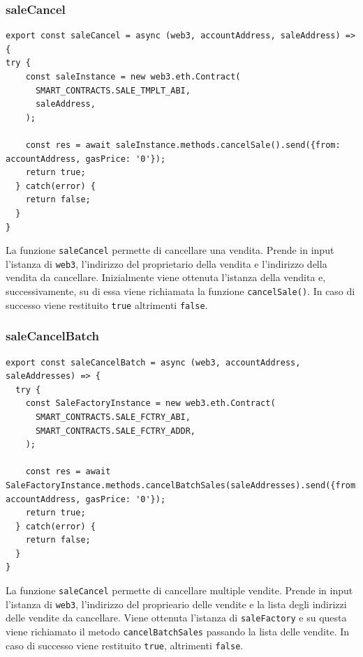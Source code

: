\documentclass[a4paper]{article}
\begin{document}
        \subsubsection{saleCancel}
        \begin{lstlisting}[style=ES6, title={Funzione saleCancel}]
export const saleCancel = async (web3, accountAddress, saleAddress) => {
try {
    const saleInstance = new web3.eth.Contract(
      SMART_CONTRACTS.SALE_TMPLT_ABI,
      saleAddress,
    );

    const res = await saleInstance.methods.cancelSale().send({from: accountAddress, gasPrice: '0'});
    return true;
  } catch(error) {
    return false;
  }
}\end{lstlisting}
        La funzione \verb|saleCancel| permette di cancellare una vendita. Prende in input l'istanza di \verb|web3|, l'indirizzo del proprietario della vendita e l'indirizzo della vendita da cancellare.
        Inizialmente viene ottenuta l'istanza della vendita e, successivamente, su di essa viene richiamata la funzione \verb|cancelSale()|. In caso di successo viene restituito \verb|true| altrimenti \verb|false|.

        \subsubsection{saleCancelBatch}
        \begin{lstlisting}[style=ES6, title={Funzione saleCancelBatch}]
export const saleCancelBatch = async (web3, accountAddress, saleAddresses) => {
  try {
    const SaleFactoryInstance = new web3.eth.Contract(
      SMART_CONTRACTS.SALE_FCTRY_ABI,
      SMART_CONTRACTS.SALE_FCTRY_ADDR,
    );

    const res = await SaleFactoryInstance.methods.cancelBatchSales(saleAddresses).send({from: accountAddress, gasPrice: '0'});
    return true;
  } catch(error) {
    return false;
  }
}\end{lstlisting}
        La funzione \verb|saleCancel| permette di cancellare multiple vendite. Prende in input l'istanza di \verb|web3|, l'indirizzo del proprieario delle vendite e la lista degli indirizzi delle vendite da cancellare.
        \newline
        Viene ottenuta l'istanza di \verb|saleFactory| e su questa viene richiamato il metodo \verb|cancelBatchSales| passando la lista delle vendite. In caso di successo viene restituito \verb|true|, altrimenti \verb|false|.
\end{document}
